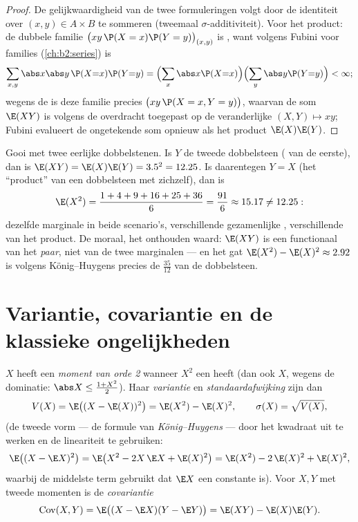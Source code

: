 \begin{proof}
De gelijkwaardigheid van de twee formuleringen volgt door de
 identiteit over $(x, y) \in A \times B$ te sommeren
(tweemaal $\sigma$-additiviteit). Voor het product: de dubbele
familie $\bigl(xy\,\P(X = x)\P(Y = y)\bigr)_{(x,y)}$ is
, want volgens Fubini voor families
(\cref{ch:b2:series}) is
\[
\sum_{x, y}\abs x \abs y\,\P(X{=}x)\P(Y{=}y)
= \Bigl(\sum_x \abs x \P(X{=}x)\Bigr)
\Bigl(\sum_y \abs y \P(Y{=}y)\Bigr) < \infty ;
\]
wegens de  is deze familie precies
$\bigl(xy\,\P(X = x, Y = y)\bigr)$, waarvan de som $\E(XY)$ is
volgens de overdracht toegepast op de veranderlijke $(X, Y) \mapsto
xy$; Fubini evalueert de ongetekende som opnieuw als het product
$\E(X)\E(Y)$.
\end{proof}

\begin{example}\label{ex:b2:randomvar:productcontrast}
Gooi met twee eerlijke dobbelstenen. Is $Y$ de tweede dobbelsteen
( van de eerste), dan is $\E(XY) = \E(X)\E(Y) =
3.5^2 = 12.25$. Is daarentegen $Y = X$ (het ``product'' van een
dobbelsteen met zichzelf), dan is
\[
\E(X^2) = \frac{1 + 4 + 9 + 16 + 25 + 36}{6} = \frac{91}{6}
\approx 15.17 \neq 12.25 :
\]
dezelfde marginale  in beide scenario's, verschillende
gezamenlijke , verschillende  van het
product. De moraal, het onthouden waard: $\E(XY)$ is een
functionaal van het \emph{paar}, niet van de twee marginalen --- en
het gat $\E(X^2) - \E(X)^2 \approx 2.92$ is volgens
König--Huygens precies de  $\frac{35}{12}$ van de
dobbelsteen.
\end{example}

\section{Variantie, covariantie en de klassieke ongelijkheden}

\begin{definition}\label{def:b2:randomvar:variance}
$X$ heeft een \emph{moment van orde 2} wanneer $X^2$ een
 heeft (dan ook $X$, wegens de dominatie: $\abs X
\leq \frac{1 + X^2}{2}$). Haar \emph{variantie} en
\emph{standaardafwijking} zijn dan
\[
V(X) = \E\bigl((X - \E(X))^2\bigr)
= \E(X^2) - \E(X)^2 ,
\qquad
\sigma(X) = \sqrt{V(X)} ,
\]
(de tweede vorm --- de formule van \emph{König--Huygens} --- door
het kwadraat uit te werken en de lineariteit te gebruiken:
\[
\E\bigl((X - \E X)^2\bigr)
= \E\bigl(X^2 - 2X\,\E X + \E(X)^2\bigr)
= \E(X^2) - 2\,\E(X)^2 + \E(X)^2 ,
\]
waarbij de middelste term gebruikt dat $\E X$ een constante is).
Voor $X, Y$ met tweede momenten is de
\emph{covariantie}
\[
\operatorname{Cov}(X, Y)
= \E\bigl((X - \E X)(Y - \E Y)\bigr)
= \E(XY) - \E(X)\E(Y) .
\]
\end{definition}

